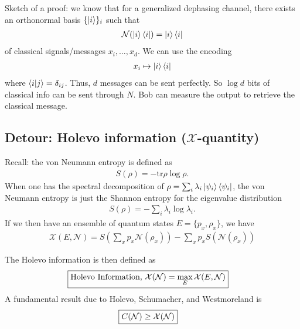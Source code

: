 \documentclass[10pt,oneside,longbibliography]{report}
\begin{document}
Sketch of a proof: we know that for a generalized dephasing channel, there exists an orthonormal basis $\{\ket{i}\}_i$ such that 
\begin{align}
    \mathcal{N}(\ket{i}\bra{i}) = \ket{i}\bra{i}
\end{align}
of classical signals/messages $x_i, \dots, x_d$. We can use the encoding
\begin{align}
    x_i \mapsto \ket{i}\bra{i}
\end{align}
where $\braket{i|j}=\delta_{ij}$. Thus, $d$ messages can be sent perfectly. So $\log{d}$ bits of classical info can be sent through $N$. Bob can measure the output to retrieve the classical message. 

\subsection{Detour: Holevo information ($\mathcal{X}$-quantity)}
Recall: the von Neumann entropy is defined as 
\begin{align}
    S(\rho) = - \text{tr} \rho \log \rho.
\end{align}
When one has the spectral decomposition of $\rho=\sum_i \lambda_i \ket{\psi_i}\bra{\psi_i}$, the von Neumann entropy is just the Shannon entropy for the eigenvalue distribution
\begin{align}
    S(\rho) = -\sum_i \lambda_i \log \lambda_i.
\end{align}
If we then have an ensemble of quantum states $E=\{p_x, \rho_x\}$, we have
\begin{align}
    \mathcal{X}(E,\mathcal{N})=S(\sum_x p_x \mathcal{N}(\rho_x)) - \sum_x p_x S(\mathcal{N}(\rho_x))
\end{align}

The Holevo information is then defined as
\begin{align}
 \Aboxed{\text{Holevo Information, } \mathcal{X}(\mathcal{N})=\max_{E} \mathcal{X}(E,\mathcal{N})}
\end{align}
A fundamental result due to Holevo, Schumacher, and Westmoreland is 
\begin{align}
    \Aboxed{C(\mathcal{N})\geq \mathcal{X}(\mathcal{N})}
\end{align}
\end{document}
